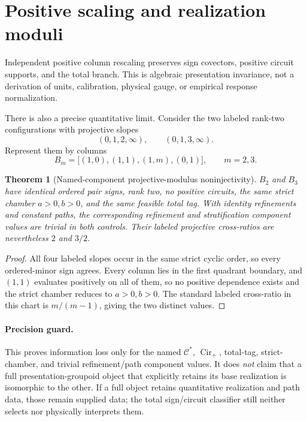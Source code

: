 \documentclass[11pt]{article}
\newtheorem{theorem}{Theorem}
\newcommand{\Cstar}{\mathcal{C}^{*}}
\newcommand{\Cirp}{\operatorname{Cir}_{+}}
\begin{document}
\section{Positive scaling and realization moduli}

Independent positive column rescaling preserves sign covectors, positive
circuit supports, and the total branch.  This is algebraic presentation
invariance, not a derivation of units, calibration, physical gauge, or
empirical response normalization.

There is also a precise quantitative limit.  Consider the two labeled
rank-two configurations with projective slopes
\[
 (0,1,2,\infty),\qquad (0,1,3,\infty).
\]
Represent them by columns
\[
 B_m=\bigl[(1,0),(1,1),(1,m),(0,1)\bigr],\qquad m=2,3.
\]

\begin{theorem}[Named-component projective-modulus noninjectivity]
$B_2$ and $B_3$ have identical ordered pair signs, rank two, no positive
circuits, the same strict chamber $a>0,b>0$, and the same feasible total tag.
With identity refinements and constant paths, the corresponding refinement
and stratification component values are trivial in both controls.  Their
labeled projective cross-ratios are nevertheless $2$ and $3/2$.
\end{theorem}

\begin{proof}
All four labeled slopes occur in the same strict cyclic order, so every
ordered-minor sign agrees.  Every column lies in the first quadrant boundary,
and $(1,1)$ evaluates positively on all of them, so no positive dependence
exists and the strict chamber reduces to $a>0,b>0$.  The standard labeled
cross-ratio in this chart is $m/(m-1)$, giving the two distinct values.
\end{proof}

\paragraph{Precision guard.}
This proves information loss only for the named $\Cstar$, $\Cirp$, total-tag,
strict-chamber, and trivial refinement/path component values.  It does
\emph{not} claim that a full presentation-groupoid object that explicitly
retains its base realization is isomorphic to the other.  If a full object
retains quantitative realization and path data, those remain supplied data;
the total sign/circuit classifier still neither selects nor physically
interprets them.
\end{document}
